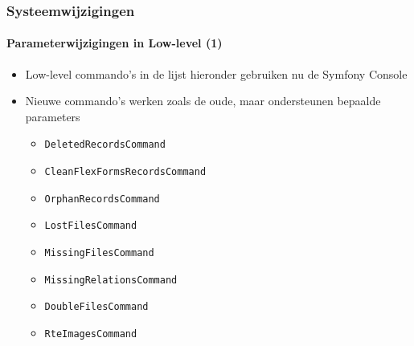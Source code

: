 \begin{frame}[fragile]
	\frametitle{Systeemwijzigingen}
	\framesubtitle{Parameterwijzigingen in Low-level (1)}


	\begin{itemize}
		\item Low-level commando's in de lijst hieronder gebruiken nu de Symfony Console
		\item Nieuwe commando's werken zoals de oude, maar ondersteunen bepaalde parameters

			\begin{itemize}
				\item \texttt{DeletedRecordsCommand}
				\item \texttt{CleanFlexFormsRecordsCommand}
				\item \texttt{OrphanRecordsCommand}
				\item \texttt{LostFilesCommand}
				\item \texttt{MissingFilesCommand}
				\item \texttt{MissingRelationsCommand}
				\item \texttt{DoubleFilesCommand}
				\item \texttt{RteImagesCommand}
			\end{itemize}

	\end{itemize}

\end{frame}



